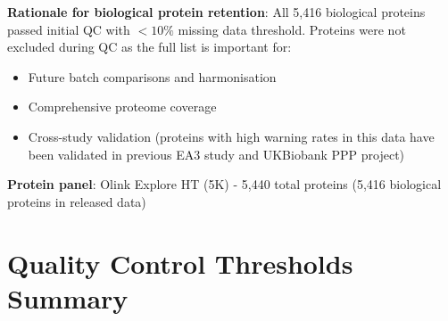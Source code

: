 \documentclass[11pt,a4paper]{article}
\begin{document}
\textbf{Rationale for biological protein retention}: All 5,416 biological proteins passed initial QC with $<10\%$ missing data threshold. Proteins were not excluded during QC as the full list is important for:
\begin{itemize}
\item Future batch comparisons and harmonisation
\item Comprehensive proteome coverage
\item Cross-study validation (proteins with high warning rates in this data have been validated in previous EA3 study and UKBiobank PPP project)
\end{itemize}

\textbf{Protein panel}: Olink Explore HT (5K) - 5,440 total proteins (5,416 biological proteins in released data)

\section{Quality Control Thresholds Summary}
\label{sec:threshold_strategy}
\end{document}
